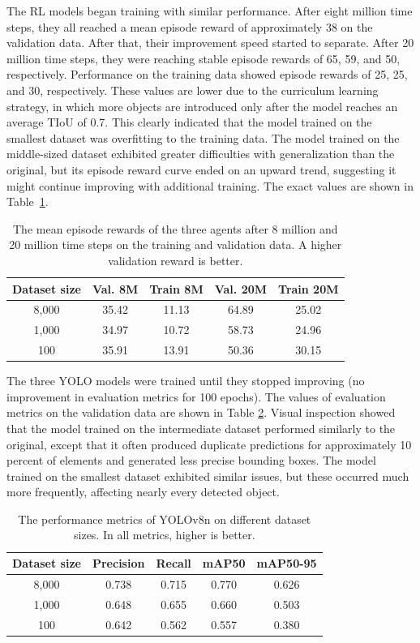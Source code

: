 \documentclass[
  digital,     %
  oneside,     %
  nosansbold,  %
  nocolorbold, %
  lof,         %
  lot,         %
]{fithesis4}
\begin{document}
The RL models began training with similar performance. After eight million time steps, they all reached a mean episode reward of approximately 38 on the validation data. After that, their improvement speed started to separate. After 20 million time steps, they were reaching stable episode rewards of 65, 59, and 50, respectively. Performance on the training data showed episode rewards of 25, 25, and 30, respectively. These values are lower due to the curriculum learning strategy, in which more objects are introduced only after the model reaches an average TIoU of 0.7. This clearly indicated that the model trained on the smallest dataset was overfitting to the training data. The model trained on the middle-sized dataset exhibited greater difficulties with generalization than the original, but its episode reward curve ended on an upward trend, suggesting it might continue improving with additional training. The exact values are shown in Table~\ref{tab:rl_results}.

\begin{table}
    \centering
    \begin{tabular}{c|cccc}
        Dataset size & Val. 8M & Train 8M & Val. 20M & Train 20M \\
         \hline
        8,000 & 35.42 & 11.13 & 64.89 & 25.02 \\
        1,000 & 34.97 & 10.72 & 58.73 & 24.96 \\
        100   & 35.91 & 13.91 & 50.36 & 30.15 \\
    \end{tabular}
    \caption{The mean episode rewards of the three agents after 8 million and 20 million time steps on the training and validation data. A higher validation reward is better.}
    \label{tab:rl_results}
\end{table}

The three YOLO models were trained until they stopped improving (no improvement in evaluation metrics for 100 epochs). The values of evaluation metrics on the validation data are shown in Table \ref{tab:yolo_results}. Visual inspection showed that the model trained on the intermediate dataset performed similarly to the original, except that it often produced duplicate predictions for approximately 10 percent of elements and generated less precise bounding boxes. The model trained on the smallest dataset exhibited similar issues, but these occurred much more frequently, affecting nearly every detected object.

\begin{table}
    \centering
    \begin{tabular}{c|cccc}
        Dataset size & Precision & Recall & mAP50 & mAP50-95 \\
         \hline
        8,000 & 0.738 & 0.715 & 0.770 & 0.626 \\
        1,000 & 0.648 & 0.655 & 0.660 & 0.503 \\
        100   & 0.642 & 0.562 & 0.557 & 0.380 \\
    \end{tabular}
    \caption{The performance metrics of YOLOv8n on different dataset sizes. In all metrics, higher is better.}
    \label{tab:yolo_results}
\end{table}
\end{document}
